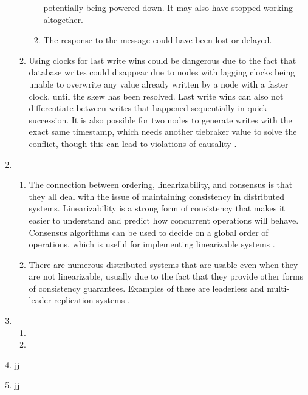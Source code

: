 \begin{enumerate}
\begin{enumerate}
\begin{enumerate}
                    potentially being powered down. It may also have stopped 
                    working altogether.
                \item The response to the message could have been lost or 
                    delayed.
            \end{enumerate}
            \autocite[p.~278]{kleppmann_2017}
        \item Using clocks for last write wins could be dangerous due to the
            fact that database writes could disappear due to nodes with 
            lagging clocks being unable to overwrite any value already written
            by a node with a faster clock, until the skew has been resolved.
            Last write wins can also not differentiate between writes that
            happened sequentially in quick succession. It is also possible for 
            two nodes to generate writes with the exact same timestamp, which
            needs another tiebraker value to solve the conflict, though this 
            can lead to violations of causality 
            \autocite[pp.~292-293]{kleppmann_2017}.
    \end{enumerate}
    \item 
    \begin{enumerate}
        \item The connection between ordering, linearizability, and consensus
            is that they all deal with the issue of maintaining consistency in 
            distributed systems. Linearizability is a strong form of consistency 
            that makes it easier to understand and predict how concurrent 
            operations will behave. Consensus algorithms can be used to decide 
            on a global order of operations, which is useful for implementing 
            linearizable systems \autocite[pp.~373-375]{kleppmann_2017}.
        \item There are numerous distributed systems that are usable even when
            they are not linearizable, usually due to the fact that they provide
            other forms of consistency guarantees. Examples of these are 
            leaderless and multi-leader replication systems 
            \autocite[p.~375]{kleppmann_2017}. 
    \end{enumerate}
    \item 
    \begin{enumerate}
        \item 
        \item 
    \end{enumerate}
    \item jj
    \item jj
  \end{enumerate}

\newpage
\printbibliography

